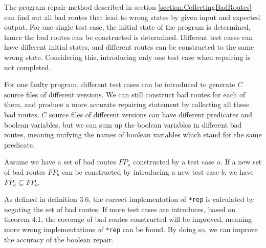 The program repair method described in section \ref{section:CollectingBadRoutes} can find out all bad routes that lead to wrong states by given input and expected output.
For one single test case, the initial state of the program is determined, hance the bad routes can be constructed is determined.
Different test cases can have different initial states, and different routes can be constructed to the same wrong state.
Considering this, introducing only one test case when repairing is not completed.

For one faulty program, different test cases can be introduced to generate $C$ source files of different versions.
We can still construct bad routes for each of them, and produce a more accurate repairing statement by collecting all these bad routes.
$C$ source files of different versions can have different predicates and boolean variables,
but we can sum up the boolean variables in different bad routes, meaning unifying the names of boolean variables which stand for the same predicate.

\begin{theorem}
Assume we have a set of bad routes $FP_{a}$ constructed by a test case $a$. If a new set of bad routes $FP_{b}$ can be constructed by introducing a new test case $b$,
we have $FP_{a} \subseteq FP_{b}$.
\end{theorem}

As defined in definition 3.6, the correct implementation of \lstinline|*rep| is calculated by negating the set of bad routes. If more test cases are introduces, based on theorem 4.1,
the coverage of bad routes constructed will be improved, meaning more wrong implementations of \lstinline|*rep| can be found. By doing so, we can improve the accuracy of the boolean repair.

